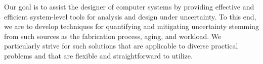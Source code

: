 Our goal is to assist the designer of computer systems by providing effective
and efficient system-level tools for analysis and design under uncertainty. To
this end, we are to develop techniques for quantifying and mitigating
uncertainty stemming from such sources as the fabrication process, aging, and
workload. We particularly strive for such solutions that are applicable to
diverse practical problems and that are flexible and straightforward to utilize.
